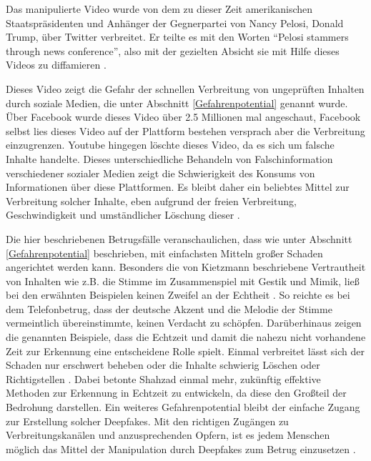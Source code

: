 Das manipulierte Video wurde von dem zu dieser Zeit amerikanischen Staatspräsidenten und Anhänger der Gegnerpartei von Nancy Pelosi, Donald Trump, über Twitter verbreitet.
Er teilte es mit den Worten ``Pelosi stammers through news conference'', also mit der gezielten Absicht sie mit Hilfe dieses Videos zu diffamieren \citep[][]{Mervosh2019}.
\par
Dieses Video zeigt die Gefahr der schnellen Verbreitung von ungeprüften Inhalten durch soziale Medien, die unter Abschnitt \ref{Gefahrenpotential} genannt wurde.
Über Facebook wurde dieses Video über 2.5 Millionen mal angeschaut, Facebook selbst lies dieses Video auf der Plattform bestehen versprach aber die Verbreitung einzugrenzen.
Youtube hingegen löschte dieses Video, da es sich um falsche Inhalte handelte.
Dieses unterschiedliche Behandeln von Falschinformation verschiedener sozialer Medien zeigt die Schwierigkeit des Konsums von Informationen über diese Plattformen.
Es bleibt daher ein beliebtes Mittel zur Verbreitung solcher Inhalte, eben aufgrund der freien Verbreitung, Geschwindigkeit und umständlicher Löschung dieser \citep[][]{Appel2022}.
\par
Die hier beschriebenen Betrugsfälle veranschaulichen, dass wie unter Abschnitt \ref{Gefahrenpotential} beschrieben, mit einfachsten Mitteln großer Schaden angerichtet werden kann.
Besonders die von Kietzmann beschriebene Vertrautheit von Inhalten wie z.B. die Stimme im Zusammenspiel mit Gestik und Mimik, ließ bei den erwähnten Beispielen keinen Zweifel an der Echtheit \citep[][]{Kietzmann2020}.
So reichte es bei dem Telefonbetrug, dass der deutsche Akzent und die Melodie der Stimme vermeintlich übereinstimmte, keinen Verdacht zu schöpfen.
Darüberhinaus zeigen die genannten Beispiele, dass die Echtzeit und damit die nahezu nicht vorhandene Zeit zur Erkennung eine entscheidene Rolle spielt.
Einmal verbreitet lässt sich der Schaden nur erschwert beheben oder die Inhalte schwierig Löschen oder Richtigstellen \citep[][]{Shahzad2022}.
Dabei betonte Shahzad einmal mehr, zukünftig effektive Methoden zur Erkennung in Echtzeit zu entwickeln, da diese den Großteil der Bedrohung darstellen.
Ein weiteres Gefahrenpotential bleibt der einfache Zugang zur Erstellung solcher Deepfakes.
Mit den richtigen Zugängen zu Verbreitungskanälen und anzusprechenden Opfern, ist es jedem Menschen möglich das Mittel der Manipulation durch Deepfakes zum Betrug einzusetzen \citep[][]{Appel2022}.